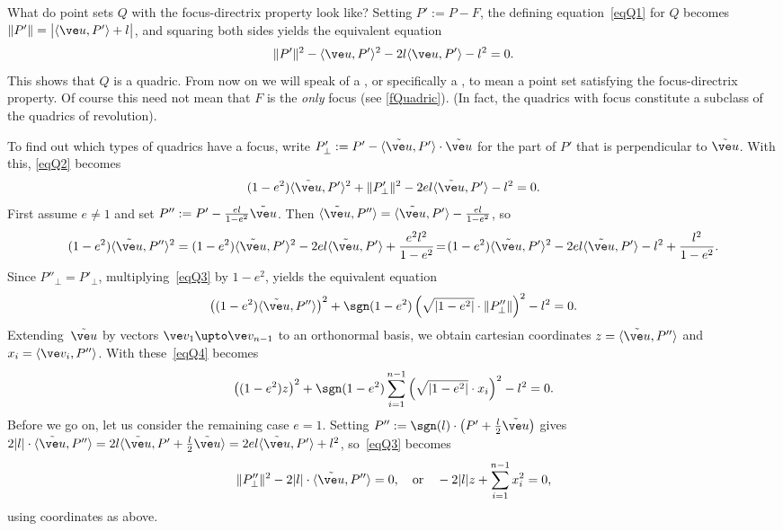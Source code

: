 \documentclass[reqno]{amsart}
\begin{document}
What do point sets $Q$ with the focus-directrix property look like?
Setting $P' := P - F$, the defining equation~\eqref{eqQ1} for $Q$
becomes $\lVert P'\rVert = \bigl| \langle\ve u,P'\rangle + l\bigr|$,
and squaring both sides yields the equivalent equation
\begin{equation} \label{eqQ2}%
  \lVert P'\rVert^2 - \langle\ve u,P'\rangle^2 - 2 l \langle\ve
  u,P'\rangle - l^2 = 0.
\end{equation}
This shows that $Q$ is a quadric. From now on we will speak of a ,
or specifically a , to mean a point set
satisfying the focus-directrix property. Of course this need not mean
that $F$ is the {\em only} focus (see \cref{fQuadric}). (In fact, the quadrics with focus constitute a subclass of the quadrics of revolution). 

To find out which types of quadrics have a focus, write
$P'_\perp := P' - \langle\tilde{\ve u},P'\rangle \cdot \tilde{\ve u}$
for the part of $P'$ that is perpendicular to $\tilde{\ve u}$. With
this, \eqref{eqQ2} becomes
\begin{equation} \label{eqQ3}%
  (1 - e^2) \langle\tilde{\ve u},P'\rangle^2 + \lVert P'_\perp\rVert^2
  -2 e l \langle\tilde{\ve u},P'\rangle - l^2 = 0.
\end{equation}
First assume $e \ne 1$ and set
$P'' := P' - \frac{e l}{1 - e^2} \tilde{\ve u}$. Then
$\langle\tilde{\ve u},P''\rangle = \langle\tilde{\ve u},P'\rangle -
\frac{e l}{1 - e^2}$, so
\[
  (1 - e^2)\langle\tilde{\ve u},P''\rangle^2 = (1 - e^2)
  \langle\tilde{\ve u},P'\rangle^2 - 2 e l \langle\tilde{\ve
    u},P'\rangle + \frac{e^2 l^2}{1 - e^2} \! = \! (1 - e^2)
  \langle\tilde{\ve u},P'\rangle^2 - 2 e l \langle\tilde{\ve
    u},P'\rangle - l^2 + \frac{l^2}{1- e^2}.
\]
Since $P''_\perp = P'_\perp$, multiplying~\eqref{eqQ3} by $1 - e^2$,
yields the equivalent equation
\begin{equation} \label{eqQ4}%
  \left((1 - e^2)\langle\tilde{\ve u},P''\rangle\right)^2 + \sgn(1 -
  e^2) \left(\sqrt{|1 - e^2|} \cdot \lVert P''_\perp\rVert\right)^2 -
  l^2 = 0.
\end{equation}
Extending~$\tilde{\ve u}$ by vectors $\ve v_1 \upto \ve v_{n-1}$ to an
orthonormal basis, we obtain cartesian coordinates
$z = \langle\tilde{\ve u},P''\rangle$ and
$x_i = \langle\ve v_i,P''\rangle$. With these~\eqref{eqQ4} becomes
\begin{equation} \label{eqQ5}%
  \left((1 - e^2) z\right)^2 + \sgn(1 - e^2) \sum_{i=1}^{n-1}
  \left(\sqrt{|1 - e^2|} \cdot x_i\right)^2 - l^2 = 0.
\end{equation}
Before we go on, let us consider the remaining case $e = 1$. Setting
$P'' := \sgn(l) \cdot \bigl(P' + \frac{l}{2} \tilde{\ve u}\bigr)$
gives
$2 |l| \cdot \langle\tilde{\ve u},P''\rangle = 2 l\langle\tilde{\ve
  u},P' + \frac{l}{2} \tilde{\ve u}\rangle = 2 e l\langle\tilde{\ve
  u},P'\rangle + l^2$, so~\eqref{eqQ3} becomes
\begin{equation} \label{eqQ6}%
  \lVert P''_\perp\rVert^2 - 2 |l| \cdot \langle\tilde{\ve
    u},P''\rangle = 0, \quad \text{or} \quad - 2 |l| z +
  \sum_{i=1}^{n-1} x_i^2 = 0,
\end{equation}
using coordinates as above.
\end{document}
